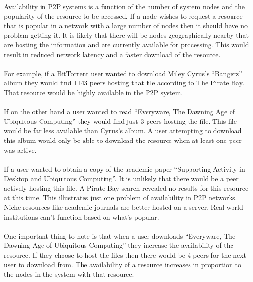 \documentclass[11pt]{amsart}
\begin{document}
\paragraph{}
Availability in P2P systems is a function of the number of system nodes and the popularity of the resource to be accessed. If a node wishes to request a resource that is popular in a network with a large number of nodes then it should have no problem getting it. It is likely that there will be nodes geographically nearby that are hosting the information and are currently available for processing. This would result in reduced network latency and a faster download of the resource.

\paragraph{}
For example, if a BitTorrent user wanted to download Miley Cyrus's ``Bangerz'' album they would find 1143 peers hosting that file according to The Pirate Bay. That resource would be highly available in the P2P system.\cite{Miley}

\paragraph{}
If on the other hand a user wanted to read ``Everyware, The Dawning Age of Ubiquitous Computing'' they would find just 3 peers hosting the file. This file would be far less available than Cyrus's album. A user attempting to download this album would only be able to download the resource when at least one peer was active.\cite{Everyware}

\paragraph{}
If a user wanted to obtain a copy of the academic paper ``Supporting Activity in Desktop and Ubiquitous Computing''. It is unlikely that there would be a peer actively hosting this file. A Pirate Bay search revealed no results for this resource at this time.
This illustrates just one problem of availability in P2P networks. Niche resources like academic journals are better hosted on a server. Real world institutions can't function based on what's popular. 

\paragraph{}
One important thing to note is that when a user downloads ``Everyware, The Dawning Age of Ubiquitous Computing'' they increase the availability of the resource. If they choose to host the files then there would be 4 peers for the next user to download from. The availability of a resource increases in proportion to the nodes in the system with that resource.
\end{document}
